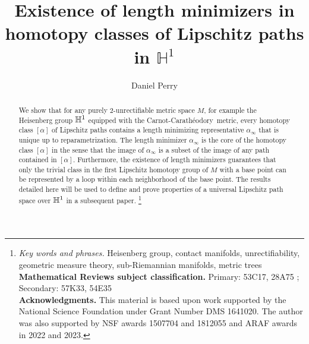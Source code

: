 \documentclass{article}
\theoremstyle{definition}
\theoremstyle{remark}
\def\cc{Carnot-Carath\'{e}odory~}
\newcommand{\length}[1]{\ell}%
\newcommand{\core}[1]{{#1}_\infty}
\DeclareMathOperator{\Lip}{Lip}
\newcommand\blfootnote[1]{%
  \begingroup
  \renewcommand\thefootnote{}\footnote{#1}%
  \addtocounter{footnote}{-1}%
  \endgroup
}
\begin{document}
\title{Existence of length minimizers in homotopy classes of Lipschitz paths in $\mathbb{H}^1$}
\author{Daniel Perry}
{\let\newpage\relax\maketitle}

  \begin{abstract}
We show that for any purely 2-unrectifiable metric space $M$, for example the Heisenberg group $\mathbb H^1$ equipped with the \cc metric, every homotopy class $[\alpha]$ of Lipschitz paths contains a length minimizing representative $\core{\alpha}$ that is unique up to reparametrization. 
The length minimizer $\core{\alpha}$ is the core of the homotopy class $[\alpha]$ in the sense that the image of $\core{\alpha}$ is a subset of the image of any path contained in $[\alpha]$. Furthermore, the existence of length minimizers guarantees that only the trivial class in the first Lipschitz homotopy group of $M$ with a base point can be represented by a loop within each neighborhood of the base point. The results detailed here will be used to define and prove properties of a universal Lipschitz path space over $\mathbb H^1$ in a subsequent paper.
 \blfootnote{{\it Key words and phrases.} Heisenberg group, contact manifolds, unrectifiability, geometric measure theory, sub-Riemannian manifolds, metric trees \\ {\bf Mathematical Reviews subject classification.} Primary: 53C17, 28A75 ; Secondary: 57K33, 54E35 \\ {\bf Acknowledgments.} This material is based upon work supported by the National Science Foundation under Grant Number DMS 1641020.  The author was also supported by NSF awards 1507704 and 1812055 and ARAF awards in 2022 and 2023.}
  \end{abstract}
\end{document}
